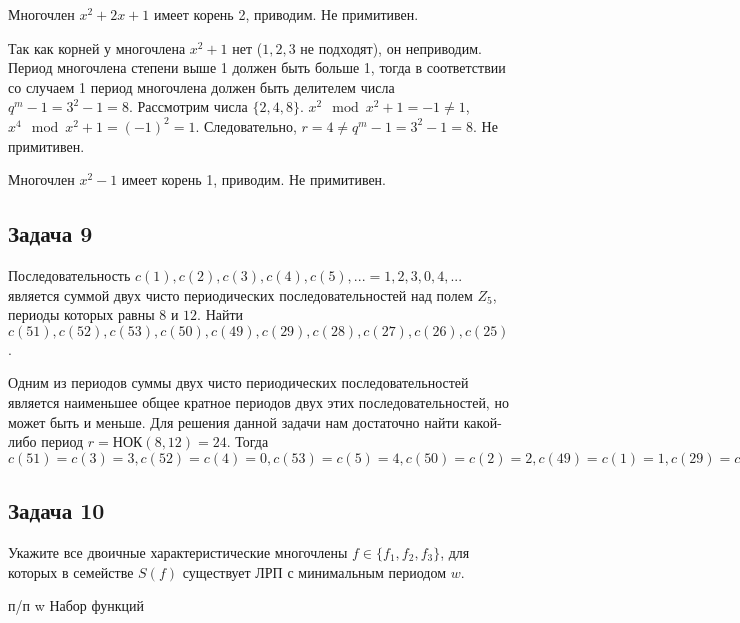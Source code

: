 \documentclass[12pt]{extarticle}
\begin{document}
\begin{enumerate}
     Многочлен $ x^2+2x+1$ имеет корень 2, приводим. Не примитивен.
     
     Так как корней у многочлена $x^2+1$ нет ($1,2,3$ не подходят), он неприводим. Период многочлена степени выше 1 должен быть больше 1, тогда в соответствии со случаем 1 период многочлена должен быть делителем числа $q^m -1 = 3^2 -1 = 8$. Рассмотрим числа $\{2, 4, 8\}$. $x^2 \mod x^2 + 1 = -1 \neq 1$,  $x^4 \mod x^2 + 1 = (-1)^2 = 1$. Следовательно, $r=4\neq q^m -1 = 3^2 -1 = 8$. Не примитивен.
     
      Многочлен $ x^2-1$ имеет корень 1, приводим. Не примитивен.
     
\end{enumerate}

\subsection{Задача 9}

Последовательность $c(1),c(2),c(3),c(4),c(5), ... = 1,2,3,0,4,...$ является суммой двух чисто периодических последовательностей над полем $Z_5$, периоды которых равны $8$ и $12$. Найти $c(51), c(52), c(53), c(50), c(49), c(29), c(28), c(27), c(26), c(25)$.

Одним из периодов суммы двух чисто периодических последовательностей является наименьшее общее кратное периодов двух этих последовательностей, но может быть и меньше. Для решения данной задачи нам достаточно найти какой-либо период $r = $НОК$(8, 12) = 24$.
Тогда $c(51)=c(3)=3, c(52)=c(4)=0, c(53)=c(5)=4, c(50)=c(2)=2, c(49)=c(1)=1, c(29)=c(5)=4, c(28)=c(4)=0, c(27)=c(3)=3, c(26)=c(2)=2, c(25)=c(1)=1$

\subsection{Задача 10}

Укажите все двоичные характеристические многочлены $f\in\{f_1, f_2, f_3\}$, для которых в семействе $S(f)$ существует ЛРП с минимальным периодом $w$.

п/п w Набор функций
\end{document}
